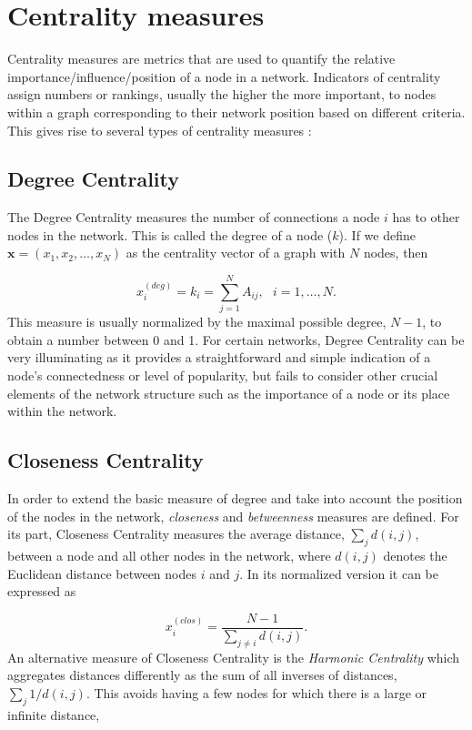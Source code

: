 \section{Centrality measures}
\label{sec:centra}
 Centrality measures are metrics that are used to quantify the relative importance/influence/position of a node in a network. Indicators of centrality assign numbers or rankings, usually the higher the more important, to nodes within a graph corresponding to their network position based on different criteria. This gives rise to several types of centrality measures \cite{newman2018networks}:

\subsection*{Degree Centrality} The Degree Centrality measures the number of connections a node $i$ has to other nodes in the network. This is called the degree of a node ($k$). If we define $\mathbf{x}=(x_1,x_2,\dots,x_N)$ as the centrality vector of a graph with $N$ nodes, then 

\begin{equation}
    x_i^{(deg)}=k_i=\sum_{j=1}^{N}A_{ij}, ~~~i = 1,\dots, N.
\end{equation}
This measure is usually normalized by the maximal possible degree, $N − 1$, to obtain a number between 0 and 1. For certain networks, Degree Centrality can be very illuminating as it provides a straightforward and simple indication of a node's connectedness or level of popularity, but fails to consider other crucial elements of the network structure such as the importance of a node or its place within the network.

\subsection*{Closeness Centrality} In order to extend the basic measure of degree and take into account the position of the nodes in the network, \textit{closeness} and \textit{betweenness} measures are defined. For its part, Closeness Centrality measures the average distance, $\sum_{j}^{}d(i,j)$, between a node and all other nodes in the network, where $d(i,j)$ denotes the Euclidean distance between nodes $i$ and $j$. In its normalized version it can be expressed as

\begin{equation}
    x_i^{(clos)}= \frac{N-1}{\sum_{j\ne i}^{}d(i,j)}.
\end{equation}
An alternative measure of Closeness Centrality is the \textit{Harmonic Centrality} which aggregates distances differently as the sum of all inverses
of distances, $\sum_{j}^{}1/d(i,j)$. This avoids having a few nodes for which there is a large or infinite distance,

